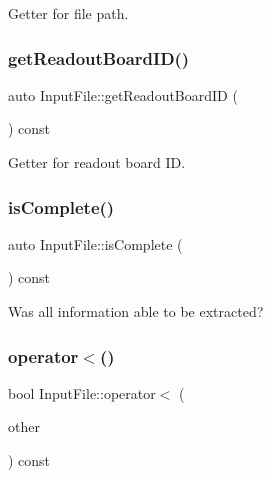 Getter for file path. 

\mbox{\label{class_input_file_a96c696bb882f54671ad897501440fd17}} 
\subsubsection{\texorpdfstring{get\+Readout\+Board\+I\+D()}{getReadoutBoardID()}}
{\footnotesize\ttfamily auto Input\+File\+::get\+Readout\+Board\+ID (\begin{DoxyParamCaption}{ }\end{DoxyParamCaption}) const\hspace{0.3cm}{\ttfamily [inline]}}



Getter for readout board ID. 

\mbox{\label{class_input_file_a65406d6a016391c2cccb0e6e4ee08099}} 
\subsubsection{\texorpdfstring{is\+Complete()}{isComplete()}}
{\footnotesize\ttfamily auto Input\+File\+::is\+Complete (\begin{DoxyParamCaption}{ }\end{DoxyParamCaption}) const\hspace{0.3cm}{\ttfamily [inline]}}



Was all information able to be extracted? 

\mbox{\label{class_input_file_a8c7c438538b8b183454632c27a55f701}} 
\subsubsection{\texorpdfstring{operator$<$()}{operator<()}}
{\footnotesize\ttfamily bool Input\+File\+::operator$<$ (\begin{DoxyParamCaption}\item[{const \hyperlink{class_input_file}{Input\+File} \&}]{other }\end{DoxyParamCaption}) const}



